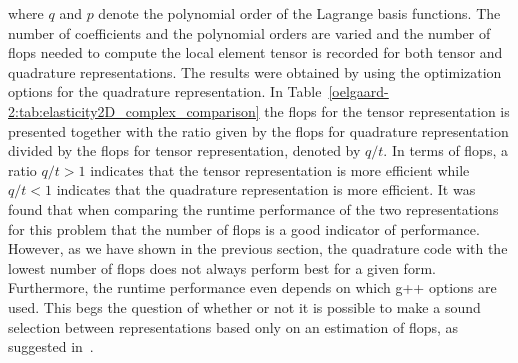 where $q$ and $p$ denote the polynomial order of the Lagrange basis
functions.  The number of coefficients and the polynomial orders are
varied and the number of flops needed to compute the local element
tensor is recorded for both tensor and quadrature representations.
The results were obtained by using the optimization options  for the quadrature
representation.  In
Table~\ref{oelgaard-2:tab:elasticity2D_complex_comparison} the flops
for the tensor representation is presented together with the ratio
given by the flops for quadrature representation divided by the flops
for tensor representation, denoted by $q/t$.  In terms of flops, a
ratio $q/t > 1$ indicates that the tensor representation is more
efficient while $q/t < 1$ indicates that the quadrature representation
is more efficient.  It was found that when comparing the runtime
performance of the two representations for this problem that the
number of flops is a good indicator of performance.  However, as we
have shown in the previous section, the quadrature code with the
lowest number of flops does not always perform best for a given
form. Furthermore, the runtime performance even depends on which g++
options are used.  This begs the question of whether or not it is
possible to make a sound selection between representations based only
on an estimation of flops, as suggested in~\citet{OelgaardWells2010}.

